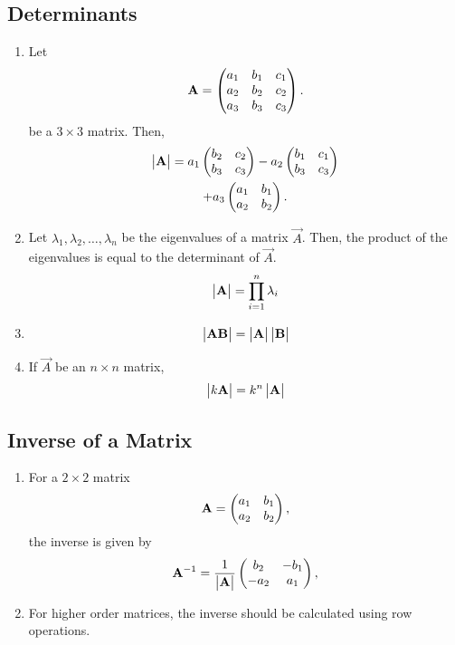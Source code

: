 \documentclass[journal,12pt,twocolumn]{IEEEtran}
\renewcommand\thesection{\arabic{section}}
\renewcommand\thesubsection{\thesection.\arabic{subsection}}
\begin{document}
\subsection{Determinants}
\renewcommand{\theequation}{\theenumi}
\begin{enumerate}[label=\thesubsection.\arabic*.,ref=\thesubsection.\theenumi]

\item Let 
\begin{align}
	\mathbf{A} = \begin{pmatrix} a_1 & b_1 & c_1  \\ a_2 & b_2 & c_2  \\ a_3 & b_3 & c_3\end{pmatrix}.
\end{align}
be a $3 \times 3$ matrix. 
Then, 
\begin{multline}
	\begin{vmatrix}\mathbf{A}\end{vmatrix} = a_1 \begin{pmatrix}  b_2 & c_2 \\  b_3 & c_3\end{pmatrix} - a_2\begin{pmatrix}  b_1 & c_1 \\  b_3 & c_3 \end{pmatrix}  \\ + a_3\begin{pmatrix} a_1 & b_1 \\ a_2 & b_2 \end{pmatrix}.
\end{multline}
\item Let $\lambda_1,\lambda_2, \dots, \lambda_n$ be the eigenvalues of a matrix $\vec{A}$.  Then,   the product of the eigenvalues is equal to the determinant of $\vec{A}$.
\begin{align}
	\begin{vmatrix}\mathbf{A}\end{vmatrix} = \prod_{i=1}^{n}\lambda_i
\end{align}
%
\item 
\begin{align}
	\begin{vmatrix}\mathbf{A}\mathbf{B}\end{vmatrix} = \begin{vmatrix}\mathbf{A}\end{vmatrix}\begin{vmatrix}\mathbf{B}\end{vmatrix}
\end{align}
\item If $\vec{A}$ be an $n \times n$ matrix, 
\begin{align}
	\begin{vmatrix}k\mathbf{A}\end{vmatrix} = k^n\begin{vmatrix}\mathbf{A}\end{vmatrix}
\end{align}

\end{enumerate}
\subsection{Inverse of a Matrix}
\renewcommand{\theequation}{\theenumi}
\begin{enumerate}[label=\thesubsection.\arabic*.,ref=\thesubsection.\theenumi]
\item For a $2 \times 2$ matrix 
\begin{align}
	\mathbf{A} = \begin{pmatrix} a_1 & b_1  \\ a_2 & b_2 \end{pmatrix},
\end{align}
the inverse is given by 
\begin{align}
	\mathbf{A}^{-1} = \frac{1}{\begin{vmatrix}\mathbf{A}\end{vmatrix}}\begin{pmatrix} b_2 & -b_1  \\ -a_2 & a_1 \end{pmatrix},
\end{align}
\item For higher order matrices, the inverse should be calculated using row operations.
\end{enumerate}
\end{document}
